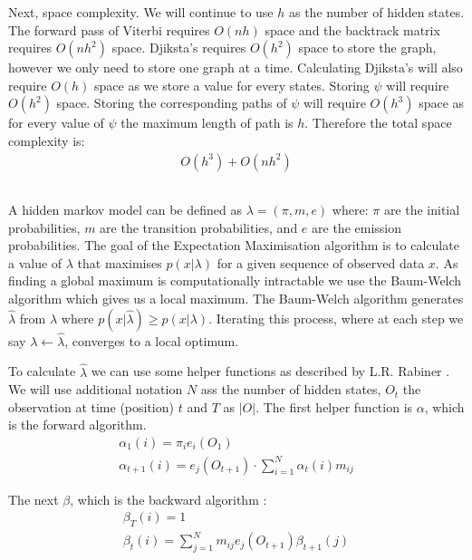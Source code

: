 Next, space complexity. We will continue to use $h$ as the number of hidden states. The forward pass of Viterbi requires $O(nh)$ space and the backtrack matrix requires $O(nh^2)$ space. Djiksta's requires $O(h^2)$ space to store the graph, however we only need to store one graph at a time. Calculating Djiksta's will also require $O(h)$ space as we store a value for every states. Storing $\psi$ will require $O(h^2)$ space. Storing the corresponding paths of $\psi$ will require $O(h^3)$ space as for every value of $\psi$ the maximum length of path is $h$. Therefore the total space complexity is:
\begin{align*}
    O(h^3) + O(nh^2)
\end{align*} 



\subsection{}
A hidden markov model can be defined as $\lambda = (\pi, m, e)$ where: $\pi$ are the initial probabilities, $m$ are the transition probabilities, and $e$ are the emission probabilities.
The goal of the Expectation Maximisation algorithm is to calculate a value of $\lambda$ that maximises $p(x|\lambda)$ for a given sequence of observed data $x$. As finding a global maximum is computationally intractable we use the Baum-Welch algorithm which gives us a local maximum. The Baum-Welch algorithm generates $\hat{\lambda}$ from $\lambda$ where $p(x|\hat{\lambda}) \geq p(x|\lambda)$. Iterating this process, where at each step we say $\lambda \gets \hat{\lambda}$, converges to a local optimum.

To calculate $\hat{\lambda}$ we can use some helper functions as described by L.R. Rabiner \cite{em}. We will use additional notation $N$ ass the number of hidden states, $O_t$ the observation at time (position) $t$ and $T$ as $|O|$.  The first helper function is $\alpha$, which is the forward algorithm.
\begin{gather*}
    \alpha_1(i) = \pi_i e_i(O_1)\\
    \alpha_{t+1}(i) = e_j(O_{t+1}) \cdot \sum_{i=1}^N\alpha_t(i)m_{ij}
\end{gather*}

The next $\beta$, which is the backward algorithm :
\begin{gather*}
    \beta_T(i)=1\\
    \beta_t(i)=\sum_{j=1}^N m_{ij} e_j(O_{t+1}) \beta_{t+1}(j)
\end{gather*}

